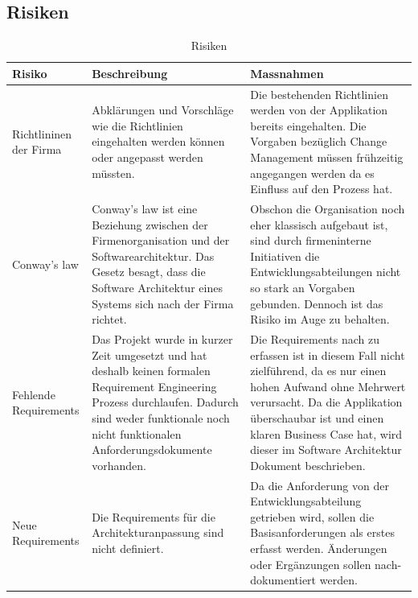 \begin{landscape}
\section{Risiken}
\begin{table}[h!]
	\centering
	\caption{Risiken}
	\begin{tabular}{ | p{2cm} | p{10cm} | p{10cm} | }
		\toprule
		{\textbf{Risiko}} & {\textbf{Beschreibung}} & {\textbf{Massnahmen}} \\
		\midrule
		Richtlininen der Firma & Abklärungen und Vorschläge wie die Richtlinien eingehalten werden können oder angepasst werden müssten. & Die bestehenden Richtlinien werden von der Applikation bereits eingehalten. Die Vorgaben bezüglich Change Management müssen frühzeitig angegangen werden da es Einfluss auf den Prozess hat. \\ \hline
		Conway's law & Conway's law ist eine Beziehung zwischen der Firmenorganisation und der Softwarearchitektur. Das Gesetz besagt, dass die Software Architektur eines Systems sich nach der Firma richtet. & Obschon die Organisation noch eher klassisch aufgebaut ist, sind durch firmeninterne Initiativen die Entwicklungsabteilungen nicht so stark an Vorgaben gebunden. Dennoch ist das Risiko im Auge zu behalten. \\ \hline
		Fehlende Requirements & Das Projekt wurde in kurzer Zeit umgesetzt und hat deshalb keinen formalen Requirement Engineering Prozess durchlaufen. Dadurch sind weder funktionale noch nicht funktionalen Anforderungsdokumente vorhanden. & Die Requirements nach zu erfassen ist in diesem Fall nicht zielführend, da es nur einen hohen Aufwand ohne Mehrwert verursacht. Da die Applikation überschaubar ist und einen klaren Business Case hat,  wird dieser im Software Architektur Dokument beschrieben.\\ \hline
		Neue Requirements & Die Requirements für die Architekturanpassung sind nicht definiert. & Da die Anforderung von der Entwicklungsabteilung getrieben wird, sollen die Basisanforderungen als erstes erfasst werden. Änderungen oder Ergänzungen sollen nach-dokumentiert werden.\\
		\bottomrule
	\end{tabular}
\end{table}

\end{landscape}
\restoregeometry